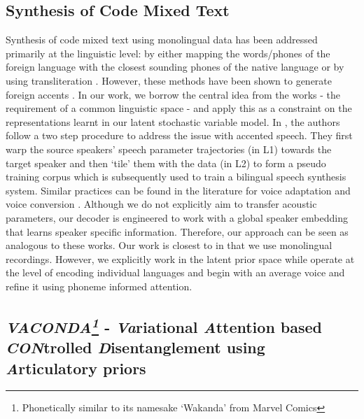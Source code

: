 \subsection{Synthesis of Code Mixed Text}
Synthesis of code mixed text using monolingual data \cite{elluru2013word, chandu2017speech} has been addressed primarily at the linguistic level:  by either mapping the words/phones of the foreign language with the closest sounding phones of the native language or by using transliteration \cite{sitaram2015experiments,sitaram2016speech}. However, these methods have been shown to generate foreign accents \cite{tomokiyo2005foreign, campbell2001talking, badino2004language}. In our work, we borrow the central idea from the works - the requirement of a common linguistic space - and apply this as a constraint on the representations learnt in our latent stochastic variable model.  In \cite{frank_soong_frame_mapping}, the authors follow a two step procedure to address the issue with accented speech. They first warp the source speakers' speech parameter trajectories (in L1) towards the target speaker and then `tile' them with the data (in L2) to form a pseudo training corpus which is subsequently used to train a bilingual speech synthesis system. Similar practices can be found in the literature for voice adaptation \cite{kain_personalizing,kurimo_personalizing, oura_unsupervised, yamagishi_SAT, latorre2005polyglot} and voice conversion \cite{david_sundermann_unitselection_voiceconversion}. Although we do not explicitly aim to transfer acoustic parameters, our decoder is engineered to work with a global speaker embedding that learns speaker specific information. Therefore, our approach can be seen as analogous to these works. Our work is closest to \cite{end2endcstts_mixofmono_helenming, phoneme_attention_mixedlingualneuralbilingualtts} in that we use monolingual recordings. However, we explicitly work in the latent prior space while \cite{end2endcstts_mixofmono_helenming} operate at the level of encoding individual languages and \cite{phoneme_attention_mixedlingualneuralbilingualtts} begin with an average voice and refine it using phoneme informed attention. 



\subsection{\textit{VACONDA\footnote{Phonetically similar to its namesake `Wakanda' from Marvel Comics}} - \textit{Va}riational \textit{A}ttention based \textit{CON}trolled \textit{D}isentanglement using \textit{A}rticulatory priors}


